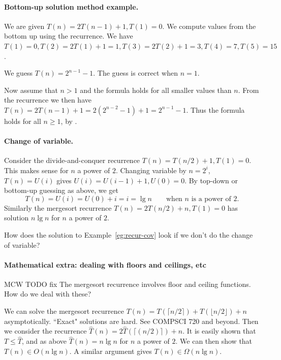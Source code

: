 \paragraph{Bottom-up solution method example.}
\begin{Example}
We are given $T(n) = 2 T(n - 1) + 1, T(1) = 0$. We compute values from the
 bottom up using the recurrence. We have $T(1) = 0, T(2) = 2T(1) + 1 = 1, T(3) = 2T(2) + 1 = 3, T(4) = 7, 
T(5) = 15$. 

We guess $T(n) = 2^{n-1} - 1$. The guess is correct when $n = 1$. 

Now assume that $n > 1$ and the formula holds 
for all smaller values than $n$. From the recurrence we then have 
$T(n) = 2T(n-1) + 1 = 2(2^{n-2} - 1) + 1 = 2^{n-1} - 1$. 
Thus the formula holds for all $n\geq 1$, by .
\end{Example}

\paragraph{Change of variable.}
\begin{Example}
\label{eg:recur-cov}
Consider the divide-and-conquer recurrence $T(n) = T(n/2) + 1, T(1) = 0$. 
This makes sense for $n$ a power of $2$.
Changing variable by $n = 2^i$, $T(n) = U(i)$ 
gives $U(i) = U(i-1) + 1, U(0) = 0$. 
By top-down or bottom-up guessing as above, we get 
$$T(n) = U(i) = U(0) + i = i = \lg n \qquad \text{when } n \text{ is a power of }2\text{.}$$
Similarly the mergesort recurrence $T(n) = 2T(n/2) + n, T(1)  = 0$ 
has solution $n \lg n$ for $n$ a power of $2$.
\end{Example}


\begin{Boxample}[6]
How does the solution to Example~\ref{eg:recur-cov} look if we don't do the change of variable?

\end{Boxample}



\paragraph{Mathematical extra: dealing with floors and ceilings, etc}
MCW TODO fix
The mergesort recurrence involves floor and ceiling functions. How do we deal with these?

We can solve the mergesort recurrence $T(n) = T(\lceil n/2 \rceil) + T(\lfloor n/2 \rfloor) + n$ asymptotically. 
``Exact" solutions are hard. See COMPSCI 720 and beyond. Then we consider the recurrence $\hat{T}(n) =
2\hat{T}(\lceil(n/2)\rceil) + n$. It is easily shown that $T \leq \hat{T}$, and 
as above $\hat{T}(n) = n \lg n$ for $n$ a power of $2$. We can then show that $T(n)
\in O(n \lg n)$. A similar argument gives $T(n) \in \Omega(n \lg n)$.

